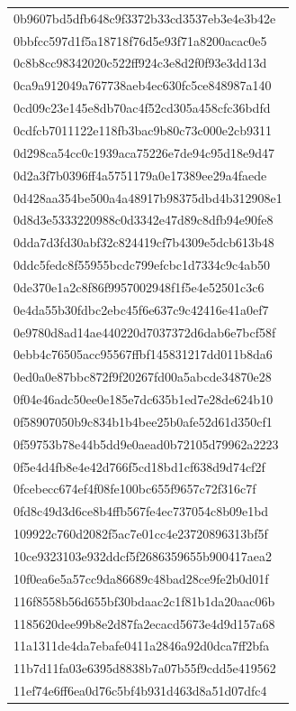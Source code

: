 \begin{tabular}{l}
0b9607bd5dfb648c9f3372b33cd3537eb3e4e3b42e \\
0bbfcc597d1f5a18718f76d5e93f71a8200acac0e5 \\
0c8b8cc98342020c522ff924c3e8d2f0f93e3dd13d \\
0ca9a912049a767738aeb4ec630fc5ce848987a140 \\
0cd09c23e145e8db70ac4f52cd305a458cfc36bdfd \\
0cdfcb7011122e118fb3bac9b80c73c000e2cb9311 \\
0d298ca54cc0c1939aca75226e7de94c95d18e9d47 \\
0d2a3f7b0396ff4a5751179a0e17389ee29a4faede \\
0d428aa354be500a4a48917b98375dbd4b312908e1 \\
0d8d3e5333220988c0d3342e47d89c8dfb94e90fe8 \\
0dda7d3fd30abf32c824419cf7b4309e5dcb613b48 \\
0ddc5fedc8f55955bcdc799efcbc1d7334c9c4ab50 \\
0de370e1a2c8f86f9957002948f1f5e4e52501c3c6 \\
0e4da55b30fdbc2ebc45f6e637c9c42416e41a0ef7 \\
0e9780d8ad14ae440220d7037372d6dab6e7bcf58f \\
0ebb4c76505acc95567ffbf145831217dd011b8da6 \\
0ed0a0e87bbc872f9f20267fd00a5abcde34870e28 \\
0f04e46adc50ee0e185e7dc635b1ed7e28de624b10 \\
0f58907050b9c834b1b4bee25b0afe52d61d350cf1 \\
0f59753b78e44b5dd9e0aead0b72105d79962a2223 \\
0f5e4d4fb8e4e42d766f5cd18bd1cf638d9d74cf2f \\
0fcebecc674ef4f08fe100bc655f9657c72f316c7f \\
0fd8c49d3d6ce8b4ffb567fe4ec737054c8b09e1bd \\
109922c760d2082f5ac7e01cc4e23720896313bf5f \\
10ce9323103e932ddcf5f2686359655b900417aea2 \\
10f0ea6e5a57cc9da86689c48bad28ce9fe2b0d01f \\
116f8558b56d655bf30bdaac2c1f81b1da20aac06b \\
1185620dee99b8e2d87fa2ecacd5673e4d9d157a68 \\
11a1311de4da7ebafe0411a2846a92d0dca7ff2bfa \\
11b7d11fa03e6395d8838b7a07b55f9cdd5e419562 \\
11ef74e6ff6ea0d76c5bf4b931d463d8a51d07dfc4 \\

\end{tabular}

